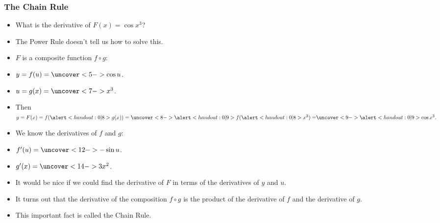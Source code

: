 \begin{frame}
\frametitle{The Chain Rule}
\begin{itemize}
\item  What is the derivative of $F(x) = \cos x^3$?  
\item<2->  The Power Rule doesn't tell us how to solve this.
\item<3->  $F$ is a composite function $f\circ g$:
\item<3-| alert@4-5,9,11-12>  $y = f(u) = \uncover<5->{\cos u}$.
\item<3-| alert@6-8,13-14>  $u = g(x) = \uncover<7->{x^3}$.
\item<3->  Then $y = F(x) = f(\alert<handout:0| 8>{g(x)}) = \uncover<8->{\alert<handout:0| 9>{f(\alert<handout:0| 8>{x^3}) =}}  \uncover<9->{\alert<handout:0| 9>{\cos x^3}.}$
\item<10->  We know the derivatives of $f$ and $g$:
\item<10-| alert@11-12>  $f'(u) = \uncover<12->{-\sin u}$.  
\item<10-| alert@13-14>  $g'(x) = \uncover<14->{3x^2}$.
\item<15->  It would be nice if we could find the derivative of $F$ in terms of the derivatives of $y$ and $u$.
\item<16->  It turns out that the derivative of the composition $f\circ g$ is the product of the derivative of $f$ and the derivative of $g$.
\item<17->  This important fact is called the Chain Rule.
\end{itemize}
\end{frame}
